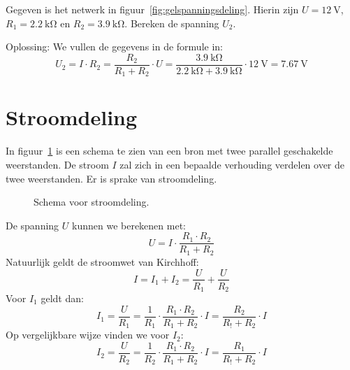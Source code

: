 \begin{example}[Spanningsdeling]
Gegeven is het netwerk in figuur~\ref{fig:gelspanningsdeling}. Hierin zijn $U=\SI{12}{\volt}$, $R_1=\SI{2.2}{\kilo\ohm}$
en $R_2=\SI{3.9}{\kilo\ohm}$. Bereken de spanning $U_2$.

Oplossing: We vullen de gegevens in de formule in:
\begin{equation}
U_2 = I\cdot R_2 = \dfrac{R_2}{R_1+R_2}\cdot U = \dfrac{\SI{3.9}{\kilo\ohm}}{\SI{2.2}{\kilo\ohm}+\SI{3.9}{\kilo\ohm}}\cdot\SI{12}{\volt} = \SI{7.67}{\volt}
\end{equation}
\end{example}


\section{Stroomdeling}
In figuur~\ref{fig:gelstroomdeling} is een schema te zien van een bron met twee parallel
geschakelde weerstanden. De stroom $I$ zal zich in een bepaalde verhouding
verdelen over de twee weerstanden. Er is sprake van stroomdeling.

\begin{figure}[!ht]
\centering
{}
\caption{Schema voor stroomdeling.}
\label{fig:gelstroomdeling}
\end{figure}

De spanning $U$ kunnen we berekenen met:
%
\begin{equation}
U = I\cdot\dfrac{R_1\cdot R_2}{R_1+R_2}
\end{equation}
%
Natuurlijk geldt de stroomwet van Kirchhoff:
%
\begin{equation}
I = I_1 + I_2 = \dfrac{U}{R_1} + \dfrac{U}{R_2}
\end{equation}
%
Voor $I_1$ geldt dan:
%
\begin{equation}
I_1 = \dfrac{U}{R_1} = \dfrac{1}{R_1}\cdot\dfrac{R_1\cdot R_2}{R_1+R_2}\cdot I = \dfrac{R_2}{R_!+R_2}\cdot I
\end{equation}
%
Op vergelijkbare wijze vinden we voor $I_2$:
%
\begin{equation}
I_2 = \dfrac{U}{R_2} = \dfrac{1}{R_2}\cdot\dfrac{R_1\cdot R_2}{R_1+R_2}\cdot I = \dfrac{R_1}{R_!+R_2}\cdot I
\end{equation}

